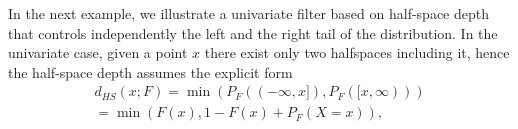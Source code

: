 \documentclass[a4paper,12pt]{article}
\begin{document}
In the next example, we illustrate a univariate filter based on half-space depth that controls independently the left and the right tail of the distribution.
In the univariate case, given a point $x$ there exist only two halfspaces including it, hence the half-space depth assumes the explicit form
\begin{align*}
d_{HS}(x;F)  =  \min (P_F((-\infty,x]),P_F([x,\infty))) \\
		    = \min (F(x) , 1 - F(x) + P_F(X = x)),
\end{align*}
\end{document}
